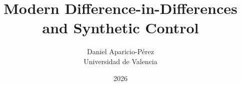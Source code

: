 \documentclass[aspectratio=169,10pt]{beamer}
\title{Modern Difference-in-Differences and Synthetic Control}
\author{Daniel Aparicio-P\'erez\\[4pt]
  \small Universidad de Valencia}
\date{2026}
\begin{document}
\maketitle









\recapbeforescm



\closingframe
\end{document}
